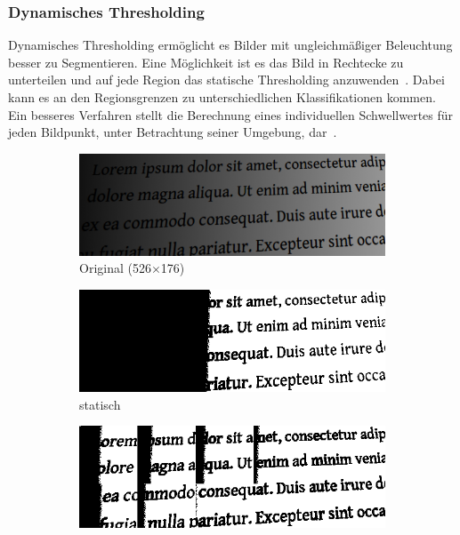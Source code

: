 \subsubsection*{Dynamisches Thresholding}
Dynamisches Thresholding ermöglicht es Bilder mit ungleichmäßiger Beleuchtung besser zu Segmentieren.
Eine Möglichkeit ist es das Bild in Rechtecke zu unterteilen und auf jede Region das statische Thresholding anzuwenden~\cite[S.~88--89]{davies2012}.
Dabei kann es an den Regionsgrenzen zu unterschiedlichen Klassifikationen kommen.
Ein besseres Verfahren stellt die Berechnung eines individuellen Schwellwertes für jeden Bildpunkt, unter Betrachtung seiner Umgebung, dar~\cite[Kapitel~4.4.2]{davies2012}.

\begin{figure}[H]
  \label{fig:segmentation}
  \centering
  \begin{subfigure}{0.49\linewidth}
    \centering
    \includegraphics[width=\linewidth]{img/basics/segmentation/original}
    \caption{Original (526$\times$176)}
  \end{subfigure}
  \begin{subfigure}{0.49\linewidth}
    \centering
    \includegraphics[width=\linewidth]{img/basics/segmentation/global}
    \caption{statisch}
  \end{subfigure}
  \begin{subfigure}{0.49\linewidth}
    \centering
    \includegraphics[width=\linewidth]{img/basics/segmentation/local}

\end{subfigure}
\end{figure}
